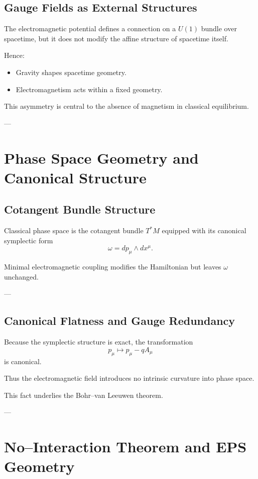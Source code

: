 \documentclass[11pt]{article}
\begin{document}
\subsection{Gauge Fields as External Structures}

The electromagnetic potential defines a connection on a $U(1)$ bundle over spacetime, but it does not modify the affine structure of spacetime itself.

Hence:
\begin{itemize}
\item Gravity shapes spacetime geometry.
\item Electromagnetism acts within a fixed geometry.
\end{itemize}

This asymmetry is central to the absence of magnetism in classical equilibrium.

---

\section{Phase Space Geometry and Canonical Structure}

\subsection{Cotangent Bundle Structure}

Classical phase space is the cotangent bundle $T^*M$ equipped with its canonical symplectic form
\[
\omega = dp_\mu \wedge dx^\mu.
\]

Minimal electromagnetic coupling modifies the Hamiltonian but leaves $\omega$ unchanged.

---

\subsection{Canonical Flatness and Gauge Redundancy}

Because the symplectic structure is exact, the transformation
\[
p_\mu \mapsto p_\mu - q A_\mu
\]
is canonical.

Thus the electromagnetic field introduces no intrinsic curvature into phase space.

This fact underlies the Bohr–van Leeuwen theorem.

---

\section{No–Interaction Theorem and EPS Geometry}
\end{document}
